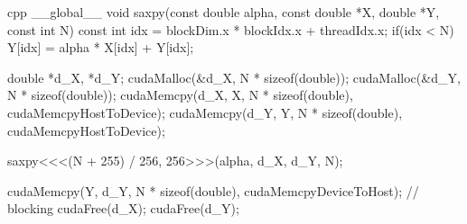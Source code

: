 \begin{listing}
    \begin{moderncode}{cpp}
__global__ void saxpy(const double alpha, const double *X, double *Y, const int N) {
    const int idx = blockDim.x * blockIdx.x + threadIdx.x;
    if(idx < N) Y[idx] = alpha * X[idx] + Y[idx];
}
    
double *d_X, *d_Y;
cudaMalloc(&d_X, N * sizeof(double));
cudaMalloc(&d_Y, N * sizeof(double));
cudaMemcpy(d_X, X, N * sizeof(double), cudaMemcpyHostToDevice);
cudaMemcpy(d_Y, Y, N * sizeof(double), cudaMemcpyHostToDevice);

saxpy<<<(N + 255) / 256, 256>>>(alpha, d_X, d_Y, N);

cudaMemcpy(Y, d_Y, N * sizeof(double), cudaMemcpyDeviceToHost);  // blocking
cudaFree(d_X);
cudaFree(d_Y);
    \end{moderncode}
    \caption{%
}
\end{listing}
